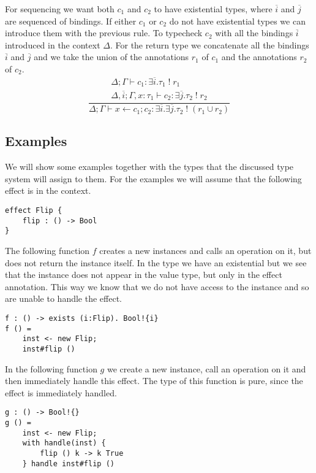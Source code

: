 \documentclass[12pt]{article}
\newcommand\ty[0]{\tau}
\newcommand\aty[2]{#1 \; ! \; #2}
\newcommand\texistss[2]{\exists \overline{#1} . #2}
\newcommand\cdo[3]{#1 \leftarrow #2 ; #3}
\begin{document}
\newpage

For sequencing we want both $c_1$ and $c_2$ to have existential types, where $\overline{i}$ and $\overline{j}$ are sequenced of bindings. If either $c_1$ or $c_2$ do not have existential types we can introduce them with the previous rule.
To typecheck $c_2$ with all the bindings $\overline{i}$ introduced in the context $\Delta$. For the return type we concatenate all the bindings $\overline{i}$ and $\overline{j}$ and we take the union of the annotations $r_1$ of $c_1$ and the annotations $r_2$ of $c_2$. \\

\[\frac{
	\begin{array}{l}
	\Delta;\Gamma \vdash c_1 : \texistss{i}{\aty{\ty_1}{r_1}} \\
	\Delta,\overline{i} ; \Gamma, x : \ty_1 \vdash c_2 : \texistss{j}{\aty{\ty_2}{r_2}}
	\end{array}
}{
	\Delta;\Gamma \vdash \cdo{x}{c_1}{c_2} : \texistss{i}{\texistss{j}{\aty{\ty_2}{(r_1 \cup r_2)}}}
}\]

\subsection{Examples}
We will show some examples together with the types that the discussed type system will assign to them.
For the examples we will assume that the following effect is in the context.
\begin{verbatim}
effect Flip {
	flip : () -> Bool
}
\end{verbatim}

The following function $f$ creates a new instances and calls an operation on it, but does not return the instance itself.
In the type we have an existential but we see that the instance does not appear in the value type, but only in the effect annotation. This way we know that we do not have access to the instance and so are unable to handle the effect.
\begin{verbatim}
f : () -> exists (i:Flip). Bool!{i}
f () =
	inst <- new Flip;
	inst#flip ()
\end{verbatim}

\newpage
In the following function $g$ we create a new instance, call an operation on it and then immediately handle this effect.
The type of this function is pure, since the effect is immediately handled.
\begin{verbatim}
g : () -> Bool!{}
g () =
	inst <- new Flip;
	with handle(inst) {
		flip () k -> k True
	} handle inst#flip ()
\end{verbatim}
\end{document}
